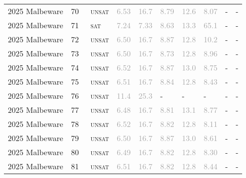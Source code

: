 \begin{center}
{\begin{longtable}{@{}llllllllll@{}}
2025 Malbeware & 70 & ~\textsc{unsat} & \textcolor{darkgray}{6.53} & \textcolor{darkgray}{16.7} & \textcolor{darkgray}{8.79} & \textcolor{darkgray}{12.6} & \textcolor{darkgray}{8.07} & - & - \\
2025 Malbeware & 71 & ~\textsc{sat} & \textcolor{darkgray}{7.24} & \textcolor{darkgray}{7.33} & \textcolor{darkgray}{8.63} & \textcolor{darkgray}{13.3} & \textcolor{darkgray}{65.1} & - & - \\
2025 Malbeware & 72 & ~\textsc{unsat} & \textcolor{darkgray}{6.50} & \textcolor{darkgray}{16.7} & \textcolor{darkgray}{8.87} & \textcolor{darkgray}{12.8} & \textcolor{darkgray}{10.2} & - & - \\
2025 Malbeware & 73 & ~\textsc{unsat} & \textcolor{darkgray}{6.50} & \textcolor{darkgray}{16.7} & \textcolor{darkgray}{8.73} & \textcolor{darkgray}{12.8} & \textcolor{darkgray}{8.96} & - & - \\
2025 Malbeware & 74 & ~\textsc{unsat} & \textcolor{darkgray}{6.52} & \textcolor{darkgray}{16.7} & \textcolor{darkgray}{8.87} & \textcolor{darkgray}{13.0} & \textcolor{darkgray}{8.75} & - & - \\
2025 Malbeware & 75 & ~\textsc{unsat} & \textcolor{darkgray}{6.51} & \textcolor{darkgray}{16.7} & \textcolor{darkgray}{8.84} & \textcolor{darkgray}{12.8} & \textcolor{darkgray}{8.43} & - & - \\
2025 Malbeware & 76 & ~\textsc{unsat} & \textcolor{darkgray}{11.4} & \textcolor{darkgray}{25.3} & - & - & - & - & - \\
2025 Malbeware & 77 & ~\textsc{unsat} & \textcolor{darkgray}{6.48} & \textcolor{darkgray}{16.7} & \textcolor{darkgray}{8.81} & \textcolor{darkgray}{13.1} & \textcolor{darkgray}{8.77} & - & - \\
2025 Malbeware & 78 & ~\textsc{unsat} & \textcolor{darkgray}{6.52} & \textcolor{darkgray}{16.7} & \textcolor{darkgray}{8.82} & \textcolor{darkgray}{12.8} & \textcolor{darkgray}{8.11} & - & - \\
2025 Malbeware & 79 & ~\textsc{unsat} & \textcolor{darkgray}{6.50} & \textcolor{darkgray}{16.7} & \textcolor{darkgray}{8.87} & \textcolor{darkgray}{13.0} & \textcolor{darkgray}{8.61} & - & - \\
2025 Malbeware & 80 & ~\textsc{unsat} & \textcolor{darkgray}{6.49} & \textcolor{darkgray}{16.7} & \textcolor{darkgray}{8.82} & \textcolor{darkgray}{12.8} & \textcolor{darkgray}{8.30} & - & - \\
2025 Malbeware & 81 & ~\textsc{unsat} & \textcolor{darkgray}{6.51} & \textcolor{darkgray}{16.7} & \textcolor{darkgray}{8.82} & \textcolor{darkgray}{12.8} & \textcolor{darkgray}{8.44} & - & - \\

\end{longtable}}
\end{center}
